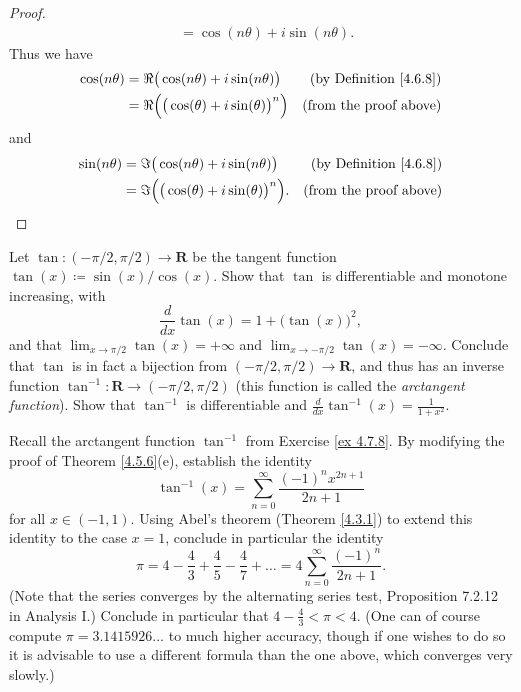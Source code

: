 \begin{proof}
\begin{align*}
         & = \cos(n \theta) + i \sin(n \theta).
    \end{align*}
    Thus we have
    \begin{align*}
        \cos(n \theta) & = \Re\big(\cos(n \theta) + i \sin(n \theta)\big)         & \text{(by Definition \ref{4.6.8})} \\
                       & = \Re\Big(\big(\cos(\theta) + i \sin(\theta)\big)^n\Big) & \text{(from the proof above)}
    \end{align*}
    and
    \begin{align*}
        \sin(n \theta) & = \Im\big(\cos(n \theta) + i \sin(n \theta)\big)          & \text{(by Definition \ref{4.6.8})} \\
                       & = \Im\Big(\big(\cos(\theta) + i \sin(\theta)\big)^n\Big). & \text{(from the proof above)}
    \end{align*}
\end{proof}

\begin{exercise}\label{ex 4.7.8}
    Let \(\tan : (- \pi / 2, \pi / 2) \to \mathbf{R}\) be the tangent function \(\tan(x) \coloneqq \sin(x) / \cos(x)\).
    Show that \(\tan\) is differentiable and monotone increasing, with
    \[
        \frac{d}{dx} \tan(x) = 1 + \big(\tan(x)\big)^2,
    \]
    and that \(\lim_{x \to \pi / 2} \tan(x) = +\infty\) and \(\lim_{x \to -\pi / 2} \tan(x) = -\infty\).
    Conclude that \(\tan\) is in fact a bijection from \((- \pi / 2, \pi / 2) \to \mathbf{R}\), and thus has an inverse function \(\tan^{-1} : \mathbf{R} \to (- \pi / 2, \pi / 2)\)
    (this function is called the \emph{arctangent function}).
    Show that \(\tan^{-1}\) is differentiable and \(\frac{d}{dx} \tan^{-1}(x) = \frac{1}{1 + x^2}\).
\end{exercise}

\begin{exercise}\label{ex 4.7.9}
    Recall the arctangent function \(\tan^{-1}\) from Exercise \ref{ex 4.7.8}.
    By modifying the proof of Theorem \ref{4.5.6}(e), establish the identity
    \[
        \tan^{-1}(x) = \sum_{n = 0}^\infty \frac{(-1)^n x^{2n + 1}}{2n + 1}
    \]
    for all \(x \in (-1, 1)\).
    Using Abel's theorem (Theorem \ref{4.3.1}) to extend this identity to the case \(x = 1\), conclude in particular the identity
    \[
        \pi = 4 - \frac{4}{3} + \frac{4}{5} - \frac{4}{7} + \dots = 4 \sum_{n = 0}^\infty \frac{(-1)^n}{2n + 1}.
    \]
    (Note that the series converges by the alternating series test, Proposition 7.2.12 in Analysis I.)
    Conclude in particular that \(4 - \frac{4}{3} < \pi < 4\).
    (One can of course compute \(\pi = 3.1415926 \dots\) to much higher accuracy, though if one wishes to do so it is advisable to use a different formula than the one above, which converges very slowly.)
\end{exercise}

